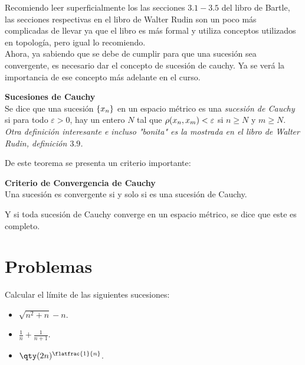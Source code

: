Recomiendo leer superficialmente los las secciones $3.1-3.5$ del libro de Bartle, las secciones respectivas en el libro de Walter Rudin son un poco más complicadas de llevar ya que el libro es más formal y utiliza conceptos utilizados en topología, pero igual lo recomiendo. \\

Ahora, ya sabiendo que se debe de cumplir para que una sucesión sea convergente, es necesario dar el concepto de sucesión de cauchy. Ya se verá la importancia de ese concepto más adelante en el curso.

\begin{mdframed}[style=warning]
	{\large \textbf{Sucesiones de Cauchy}} \\
	Se dice que una sucesión $\{ x_{n} \}$ en un espacio métrico es una \textit{sucesión de Cauchy} si para todo $\varepsilon > 0$, hay un entero $N$ tal que $\rho(x_n,x_m) < \varepsilon$ si $n\geq N$ y $m\geq N$. \\
	
	\noindent \textit{Otra definición interesante e incluso "bonita" es la mostrada en el libro de Walter Rudin, definición $3.9$.}
\end{mdframed}

De este teorema se presenta un criterio importante:


\begin{mdframed}[style=warning]
	{\large \textbf{Criterio de Convergencia de Cauchy}} \\
	Una sucesión es convergente si y solo si es una sucesión de Cauchy.
\end{mdframed}

Y si toda sucesión de Cauchy converge en un espacio métrico, se dice que este es completo.






\pagebreak


\section*{Problemas}



\begin{ejercicio}
	Calcular el límite de las siguientes sucesiones:
	\begin{itemize}
		\item $\sqrt{n^2 + n} - n$.
		\item $\frac{1}{n} + \frac{1}{n + 1}$.
		\item $\qty(2n)^{\flatfrac{1}{n}}$.
	\end{itemize}
\end{ejercicio}






